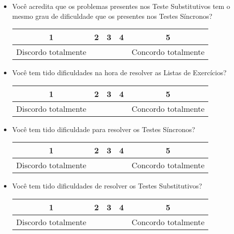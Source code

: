 \begin{itemize}
    \item Você acredita que os problemas presentes nos Teste Substitutivos tem o mesmo grau de dificuldade que os presentes nos Testes Síncronos?

\begin{minipage}{\linewidth}
\centering
\begin{tabular}{|c|c|c|c|c|}
\hline
\textbf{1} & \textbf{2} & \textbf{3} & \textbf{4} & \textbf{5} \\
\hline
Discordo totalmente & \phantom{aaaaaaaa} & \phantom{aaaaaaaa} & \phantom{aaaaaaaa} & Concordo totalmente \\
\hline
\end{tabular}
\end{minipage}

    \item Você tem tido dificuldades na hora de resolver as Listas de Exercícios?

\begin{minipage}{\linewidth}
\centering
\begin{tabular}{|c|c|c|c|c|}
\hline
\textbf{1} & \textbf{2} & \textbf{3} & \textbf{4} & \textbf{5} \\
\hline
Discordo totalmente & \phantom{aaaaaaaa} & \phantom{aaaaaaaa} & \phantom{aaaaaaaa} & Concordo totalmente \\
\hline
\end{tabular}
\end{minipage}

    \item  Você tem tido dificuldade para resolver os Testes Síncronos?

\begin{minipage}{\linewidth}
\centering
\begin{tabular}{|c|c|c|c|c|}
\hline
\textbf{1} & \textbf{2} & \textbf{3} & \textbf{4} & \textbf{5} \\
\hline
Discordo totalmente & \phantom{aaaaaaaa} & \phantom{aaaaaaaa} & \phantom{aaaaaaaa} & Concordo totalmente \\
\hline
\end{tabular}
\end{minipage}

    \item  Você tem tido dificuldades de resolver os Testes Substitutivos? 
    
\begin{minipage}{\linewidth}
\centering
\begin{tabular}{|c|c|c|c|c|}
\hline
\textbf{1} & \textbf{2} & \textbf{3} & \textbf{4} & \textbf{5} \\
\hline
Discordo totalmente & \phantom{aaaaaaaa} & \phantom{aaaaaaaa} & \phantom{aaaaaaaa} & Concordo totalmente \\
\hline
\end{tabular}
\end{minipage}


\end{itemize}

